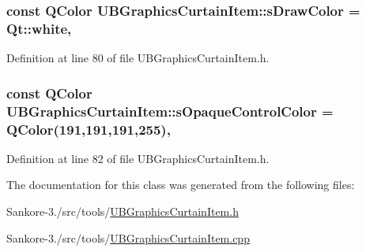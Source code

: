 \hypertarget{class_u_b_graphics_curtain_item_a39534e46257349d87fa9902b7a38b470}{
\subsubsection[{s\-Draw\-Color}]{\setlength{\rightskip}{0pt plus 5cm}const Q\-Color U\-B\-Graphics\-Curtain\-Item\-::s\-Draw\-Color = Qt\-::white\hspace{0.3cm}{\ttfamily [static]}, {\ttfamily [protected]}}}\label{d5/d13/class_u_b_graphics_curtain_item_a39534e46257349d87fa9902b7a38b470}


Definition at line 80 of file U\-B\-Graphics\-Curtain\-Item.\-h.

\hypertarget{class_u_b_graphics_curtain_item_ad4107abd347a599bd47e892f30dc8d08}{
\subsubsection[{s\-Opaque\-Control\-Color}]{\setlength{\rightskip}{0pt plus 5cm}const Q\-Color U\-B\-Graphics\-Curtain\-Item\-::s\-Opaque\-Control\-Color = Q\-Color(191,191,191,255)\hspace{0.3cm}{\ttfamily [static]}, {\ttfamily [protected]}}}\label{d5/d13/class_u_b_graphics_curtain_item_ad4107abd347a599bd47e892f30dc8d08}


Definition at line 82 of file U\-B\-Graphics\-Curtain\-Item.\-h.



The documentation for this class was generated from the following files\-:\begin{DoxyCompactItemize}
\item 
Sankore-\/3./src/tools/\hyperlink{_u_b_graphics_curtain_item_8h}{U\-B\-Graphics\-Curtain\-Item.\-h}\item 
Sankore-\/3./src/tools/\hyperlink{_u_b_graphics_curtain_item_8cpp}{U\-B\-Graphics\-Curtain\-Item.\-cpp}\end{DoxyCompactItemize}
